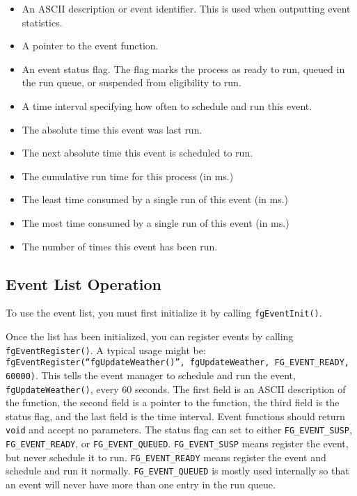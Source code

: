 \documentclass[12pt]{article}
\begin{document}
\begin{itemize}
  \item An ASCII description or event identifier.  This is used when
    outputting event statistics.

  \item A pointer to the event function.

  \item An event status flag.  The flag marks the process as ready to
    run, queued in the run queue, or suspended from eligibility to
    run.
    
  \item A time interval specifying how often to schedule and run this
    event.
                      
  \item The absolute time this event was last run.
  
  \item The next absolute time this event is scheduled to run.
    
  \item The cumulative run time for this process (in ms.)
    
  \item The least time consumed by a single run of this event (in ms.)

  \item The most time consumed by a single run of this event (in ms.)

  \item The number of times this event has been run.
\end{itemize}

\subsection{Event List Operation}

To use the event list, you must first initialize it by calling
\texttt{fgEventInit()}.  

Once the list has been initialized, you can register events by calling
\texttt{fgEventRegister()}.  A typical usage might be:
\texttt{fgEventRegister(``fgUpdateWeather()'', fgUpdateWeather,
  FG\_EVENT\_READY, 60000)}.  This tells the event manager to schedule
and run the event, \texttt{fgUpdateWeather()}, every 60 seconds.  The
first field is an ASCII description of the function, the second field
is a pointer to the function, the third field is the status flag, and
the last field is the time interval.  Event functions should return
\texttt{void} and accept no parameters.  The status flag can set to
either \texttt{FG\_EVENT\_SUSP}, \texttt{FG\_EVENT\_READY}, or
\texttt{FG\_EVENT\_QUEUED}.  \texttt{FG\_EVENT\_SUSP} means register
the event, but never schedule it to run.  \texttt{FG\_EVENT\_READY}
means register the event and schedule and run it normally.
\texttt{FG\_EVENT\_QUEUED} is mostly used internally so that an event
will never have more than one entry in the run queue.
\end{document}

